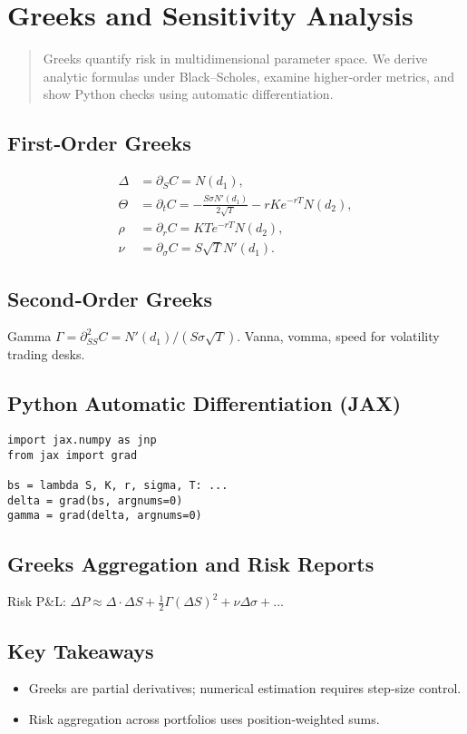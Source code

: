 \chapter{Greeks and Sensitivity Analysis}\label{ch:greeks}

\begin{abstract}
Greeks quantify risk in multidimensional parameter space.  We derive
analytic formulas under Black--Scholes, examine higher‑order metrics,
and show Python checks using automatic differentiation.
\end{abstract}

\section{First‑Order Greeks}

\[
\begin{aligned}
\Delta &= \partial_S C = N(d_1), \\
\Theta &= \partial_t C = -\frac{S\sigma N'(d_1)}{2\sqrt{T}}
                          - r K e^{-rT} N(d_2), \\
\rho   &= \partial_r C = K T e^{-rT} N(d_2), \\
\nu    &= \partial_\sigma C = S\sqrt{T} N'(d_1).
\end{aligned}
\]

\section{Second‑Order Greeks}

Gamma \(\Gamma = \partial^2_{SS} C = N'(d_1)/(S\sigma\sqrt{T})\).  
Vanna, vomma, speed for volatility trading desks.

\section{Python Automatic Differentiation (JAX)}

\begin{verbatim}
import jax.numpy as jnp
from jax import grad

bs = lambda S, K, r, sigma, T: ...
delta = grad(bs, argnums=0)
gamma = grad(delta, argnums=0)
\end{verbatim}

\section{Greeks Aggregation and Risk Reports}

Risk P\&L:
\(\Delta P \approx \Delta\cdot\Delta S + \tfrac12\Gamma(\Delta S)^2
            + \nu\Delta\sigma + \dots\)

\section*{Key Takeaways}
\begin{itemize}
  \item Greeks are partial derivatives; numerical estimation requires
        step‑size control.
  \item Risk aggregation across portfolios uses position‑weighted sums.
\end{itemize}
